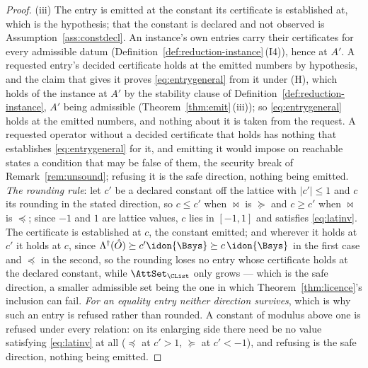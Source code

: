 \begin{proof}
(iii) The entry is emitted at the constant its certificate is established
at, which is the hypothesis; that the constant is declared and not observed
is Assumption~\ref{ass:constdecl}. An instance's own entries carry their
certificates for every admissible datum
(Definition~\ref{def:reduction-instance}\,(I4)), hence at $A'$. A requested
entry's decided certificate holds at the emitted numbers by hypothesis, and
the claim that gives it proves \eqref{eq:entrygeneral} from it under (H),
which holds of the instance at $A'$ by the stability clause of
Definition~\ref{def:reduction-instance}, $A'$ being admissible
(Theorem~\ref{thm:emit}\,(iii)); so \eqref{eq:entrygeneral} holds at the
emitted numbers, and nothing about it is taken from the request. A requested
operator without a decided certificate that holds has nothing that
establishes \eqref{eq:entrygeneral} for it, and emitting it would impose on
reachable states a condition that may be false of them, the security break
of Remark~\ref{rem:unsound}; refusing it is the safe direction, nothing
being emitted. \emph{The rounding rule}: let $c'$ be a declared constant off
the lattice with $|c'|\le1$ and $c$ its rounding in the stated direction, so
$c\le c'$ when $\bowtie$ is $\succeq$ and $c\ge c'$ when $\bowtie$ is
$\preceq$; since $-1$ and $1$ are lattice values, $c$ lies in $[-1,1]$ and
satisfies \eqref{eq:latinv}. The certificate is established at $c$, the
constant emitted; and wherever it holds at $c'$ it holds at $c$, since
$\Lambda^{\dagger}(\hat O)\succeq c'\idon{\Bsys}\succeq c\,\idon{\Bsys}$ in
the first case and $\preceq$ in the second, so the rounding loses no entry
whose certificate holds at the declared constant, while $\AttSet_{\CList}$
only grows --- which is the safe direction, a smaller admissible set being
the one in which Theorem~\ref{thm:licence}'s inclusion can fail. \emph{For an
equality entry neither direction survives}, which is why such an entry is
refused rather than rounded. A constant of modulus above one is refused under
every relation: on its enlarging side there need be no value satisfying
\eqref{eq:latinv} at all ($\preceq$ at $c'>1$, $\succeq$ at $c'<-1$), and
refusing is the safe direction, nothing being emitted.
\end{proof}
